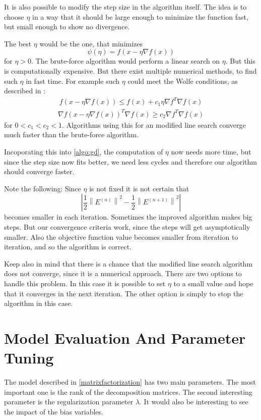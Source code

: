 \documentclass[DIV=14,twocolumn]{scrartcl}
\newcommand{\norm}[1]{\left\lVert#1\right\rVert}
\begin{document}
It is also possible to modify the step size in the algorithm itself. The idea is to choose $\eta$ in a way that it should be large enough to minimize the function fast, but small enough to show no divergence. 

The best $\eta$ would be the one, that minimizes $$\psi(\eta) = f(x-\eta\nabla f(x))$$ for $\eta > 0$. The brute-force algorithm would perform a linear search on $\eta$. But this is computationally expensive.  But there exist multiple numerical methods, to find such $\eta$ in fast time. For example such $\eta$ could meet the Wolfe conditions, as described in \cite{NoWr06}:
\begin{equation*}
\begin{split}
f(x-\eta\nabla f(x)) \leq f(x) + c_1\eta\nabla f^T\nabla f(x)
\end{split}
\end{equation*}
\begin{equation*}
\begin{split}
\nabla f(x-\eta\nabla f(x))^T\nabla f(x) \geq c_2\nabla f^T\nabla f(x)
\end{split}
\end{equation*}
for $0 < c_1 < c_2 < 1$.
Algorithms using this for an modified line search converge much faster than the brute-force algorithm.

Incoporating this into \autoref{algo:gd}, the computation of $\eta$ now needs more time, but since the step size now fits better, we need less cycles and therefore our algorithm should converge faster. 

Note the following: Since $\eta$ is not fixed it is not certain that $$\left|\frac{1}{2}\norm{E^{(n)}}^2-\frac{1}{2}\norm{E^{(n+1)}}^2\right|$$ becomes smaller in each iteration. Sometimes the improved algorithm makes big steps. But our convergence criteria work, since the steps will get asymptotically smaller. Also the objective function value becomes smaller from iteration to iteration, and so the algorithm is correct. 

Keep also in mind that there is a chance that the modified line search algorithm does not converge, since it is a numerical approach. There are two options to handle this problem. In this case it is possible to set $\eta$ to a small value and hope that it converges in the next iteration. The other option is simply to stop the algorithm in this case.

\section{Model Evaluation And Parameter Tuning}\label{parametertuning}
The model described in \autoref{matrixfactorization} has two main parameters. The most important one is the rank of the decomposition matrices. The second interesting parameter is the regularization parameter $\lambda$. It would also be interesting to see the impact of the bias variables.
\end{document}

